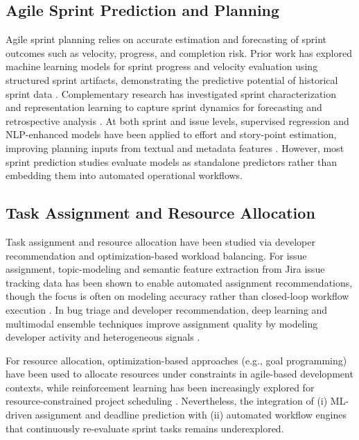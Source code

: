 \documentclass[conference]{IEEEtran}
\begin{document}
\subsection{Agile Sprint Prediction and Planning}

Agile sprint planning relies on accurate estimation and forecasting of sprint outcomes such as velocity, progress, and completion risk. Prior work has explored machine learning models for sprint progress and velocity evaluation using structured sprint artifacts, demonstrating the predictive potential of historical sprint data \cite{perezcastillo2024_sprint_velocity}. Complementary research has investigated sprint characterization and representation learning to capture sprint dynamics for forecasting and retrospective analysis \cite{choetkiertikul2025_sprint2vec}. At both sprint and issue levels, supervised regression and NLP-enhanced models have been applied to effort and story-point estimation, improving planning inputs from textual and metadata features \cite{ramessur2021_sprint_effort, yalciner2024_storypoint_sbert}. However, most sprint prediction studies evaluate models as standalone predictors rather than embedding them into automated operational workflows.

\subsection{Task Assignment and Resource Allocation}

Task assignment and resource allocation have been studied via developer recommendation and optimization-based workload balancing. For issue assignment, topic-modeling and semantic feature extraction from Jira issue tracking data has been shown to enable automated assignment recommendations, though the focus is often on modeling accuracy rather than closed-loop workflow execution \cite{diamantopoulos2023_issue_assignment}. In bug triage and developer recommendation, deep learning and multimodal ensemble techniques improve assignment quality by modeling developer activity and heterogeneous signals \cite{guo2020_bug_triage, zhang2023_susrec}.

For resource allocation, optimization-based approaches (e.g., goal programming) have been used to allocate resources under constraints in agile-based development contexts, while reinforcement learning has been increasingly explored for resource-constrained project scheduling \cite{kaur2023_agile_resource_alloc, cai2024_drl_rcpsp}. Nevertheless, the integration of (i) ML-driven assignment and deadline prediction with (ii) automated workflow engines that continuously re-evaluate sprint tasks remains underexplored.
\end{document}
